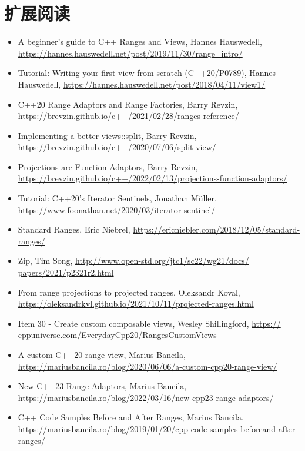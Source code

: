 \section{扩展阅读}
\begin{itemize}
\item
A beginner’s guide to C++ Ranges and Views, Hannes Hauswedell, \url{https://hannes.hauswedell.net/post/2019/11/30/range_intro/}

\item
Tutorial: Writing your first view from scratch (C++20/P0789), Hannes Hauswedell, \url{https://hannes.hauswedell.net/post/2018/04/11/view1/}

\item
C++20 Range Adaptors and Range Factories, Barry Revzin, \url{https://brevzin.github.io/c++/2021/02/28/ranges-reference/}

\item
Implementing a better views::split, Barry Revzin, \url{https://brevzin.github.io/c++/2020/07/06/split-view/}

\item
Projections are Function Adaptors, Barry Revzin, \url{https://brevzin.github.io/c++/2022/02/13/projections-function-adaptors/}

\item
Tutorial: C++20’s Iterator Sentinels, Jonathan Müller, \url{https://www.foonathan.net/2020/03/iterator-sentinel/}

\item
Standard Ranges, Eric Niebrel, \url{https://ericniebler.com/2018/12/05/standard-ranges/}

\item
Zip, Tim Song, \url{http://www.open-std.org/jtc1/sc22/wg21/docs/ papers/2021/p2321r2.html}

\item
From range projections to projected ranges, Oleksandr Koval, \url{https://oleksandrkvl.github.io/2021/10/11/projected-ranges.html}

\item
Item 30 - Create custom composable views, Wesley Shillingford, \url{https:// cppuniverse.com/EverydayCpp20/RangesCustomViews}

\item
A custom C++20 range view, Marius Bancila, \url{https://mariusbancila.ro/blog/2020/06/06/a-custom-cpp20-range-view/}

\item
New C++23 Range Adaptors, Marius Bancila, \url{https://mariusbancila.ro/blog/2022/03/16/new-cpp23-range-adaptors/}

\item
C++ Code Samples Before and After Ranges, Marius Bancila, \url{https://mariusbancila.ro/blog/2019/01/20/cpp-code-samples-beforeand-after-ranges/}
\end{itemize}